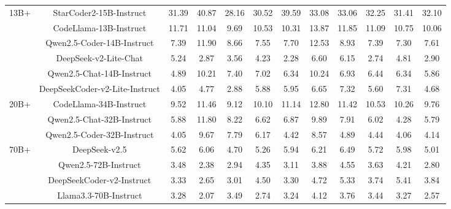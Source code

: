 \documentclass[11pt, a4paper, logo, copyright, nonumbering, amsart]{map}
\begin{document}
\begin{CJK*}{UTF8}{gbsn}
\begin{table*}[h!]
\begin{adjustbox}{width=\textwidth}
\begin{tabular}{c|c|cccccccccc}
    \midrule
    \multirow{6}{*}{13B+} 
    & StarCoder2-15B-Instruct & 31.39 & 40.87 & 28.16 & 30.52 & 39.59 & 33.08 & 33.06 & 32.25 & 31.41 & 32.10 \\
    & CodeLlama-13B-Instruct & 11.71 & 11.04 & 9.69 & 10.53 & 10.31 & 13.87 & 11.85 & 11.09 & 10.75 & 10.06 \\
    & Qwen2.5-Coder-14B-Instruct & 7.39 & 11.90 & 8.66 & 7.55 & 7.70 & 12.53 & 8.93 & 7.39 & 7.30 & 7.61 \\
    & DeepSeek-v2-Lite-Chat & 5.24 & 2.87 & 3.56 & 4.23 & 2.28 & 6.60 & 6.15 & 2.74 & 4.81 & 2.90 \\
    & Qwen2.5-Chat-14B-Instruct & 4.89 & 10.21 & 7.40 & 7.02 & 6.34 & 10.24 & 6.93 & 6.44 & 6.34 & 5.86 \\
    & DeepSeekCoder-v2-Lite-Instruct & 4.05 & 4.77 & 2.88 & 5.88 & 5.95 & 6.65 & 7.32 & 5.60 & 7.31 & 4.68 \\
    
    \midrule
    \multirow{3}{*}{20B+} 
    & CodeLlama-34B-Instruct & 9.52 & 11.46 & 9.12 & 10.10 & 11.14 & 12.80 & 11.42 & 10.53 & 10.26 & 9.76 \\
    & Qwen2.5-Chat-32B-Instruct & 5.88 & 11.80 & 8.22 & 6.62 & 6.87 & 9.89 & 7.91 & 6.02 & 4.28 & 5.79 \\
    & Qwen2.5-Coder-32B-Instruct & 4.05 & 9.67 & 7.79 & 6.17 & 4.42 & 8.57 & 4.89 & 4.44 & 4.06 & 4.14 \\
    
    \midrule
    \multirow{4}{*}{70B+} 
    & DeepSeek-v2.5 & 5.62 & 6.06 & 4.70 & 5.26 & 5.94 & 6.21 & 6.49 & 5.72 & 5.98 & 5.01 \\
    & Qwen2.5-72B-Instruct & 3.48 & 2.38 & 2.94 & 4.35 & 3.11 & 3.88 & 4.55 & 3.63 & 4.21 & 2.80 \\
    & DeepSeekCoder-v2-Instruct & 3.33 & 2.65 & 3.01 & 4.50 & 3.30 & 4.72 & 5.33 & 3.74 & 5.41 & 3.84 \\
    & Llama3.3-70B-Instruct & 3.28 & 2.07 & 3.49 & 2.74 & 3.24 & 4.12 & 3.76 & 3.44 & 3.27 & 2.57 \\
    

\end{tabular}
\end{adjustbox}
\end{table*}
\end{CJK*}
\end{document}
